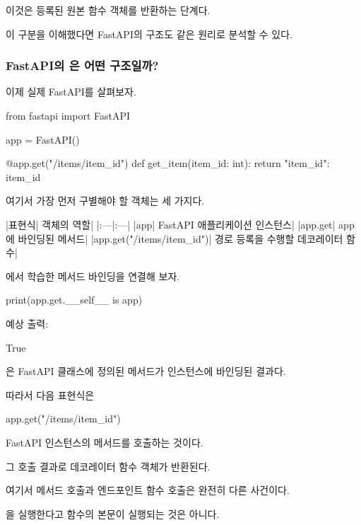 이것은 등록된 원본 함수 객체를 반환하는 단계다.

이 구분을 이해했다면 FastAPI의  구조도 같은 원리로 분석할 수 있다.

\subsubsection{FastAPI의 은 어떤 구조일까?}

이제 실제 FastAPI를 살펴보자.

\begin{dhkcode}
from fastapi import FastAPI

app = FastAPI()


@app.get("/items/{item_id}")
def get_item(item_id: int):
    return {"item_id": item_id}
\end{dhkcode}

여기서 가장 먼저 구별해야 할 객체는 세 가지다.

\begin{dhktable}
|표현식|	객체의 역할|
|:---|:---|
|app|	FastAPI 애플리케이션 인스턴스|
|app.get|	app에 바인딩된 메서드|
|app.get("/items/{item_id}")|	경로 등록을 수행할 데코레이터 함수|
\end{dhktable}

에서 학습한 메서드 바인딩을 연결해 보자.

\begin{dhkcode}
print(app.get.__self__ is app)
\end{dhkcode}

예상 출력:

\begin{dhkzsh}
True
\end{dhkzsh}

은 FastAPI 클래스에 정의된 메서드가  인스턴스에 바인딩된 결과다.

따라서 다음 표현식은

\begin{dhkcode}
app.get("/items/{item_id}")
\end{dhkcode}

FastAPI 인스턴스의  메서드를 호출하는 것이다.

그 호출 결과로 데코레이터 함수 객체가 반환된다.

여기서  메서드 호출과 엔드포인트 함수 호출은 완전히 다른 사건이다.

을 실행한다고  함수의 본문이 실행되는 것은 아니다.

